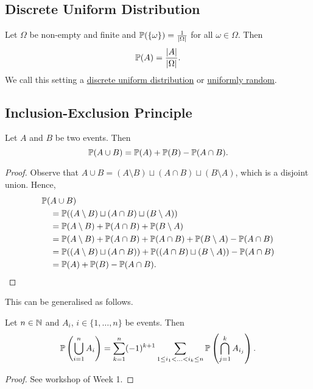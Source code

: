 \subsection{Discrete Uniform Distribution}
\begin{defn}
Let $\Omega$ be non-empty and finite and ${\mathbb P}(\{\omega\})= \frac{1}{\vert \Omega \vert }$ for all $\omega \in \Omega$.  Then
\[ {\mathbb P}(A) = \frac{ \vert A \vert }{ \vert \Omega \vert }. \]
We call this setting a \underline{discrete uniform distribution} or \underline{uniformly random}.
\end{defn}

\subsection{Inclusion-Exclusion Principle}

\begin{thm}
Let $A$ and $B$ be two events. Then
\[{\mathbb P}(A \cup B) = {\mathbb P}(A) + {\mathbb P}(B) - {\mathbb P}(A \cap B).\]
\end{thm}
\begin{proof}
Observe that $A \cup B = (A \setminus B) \sqcup (A \cap B) \sqcup (B \setminus A)$, which is a disjoint union. Hence,
\begin{align*}
{\mathbb P}(&A \cup B) 
\\ 
&= {\mathbb P}( (A \setminus B) \sqcup (A \cap B) \sqcup (B \setminus A) )
\\&
= {\mathbb P}(A \setminus B) + {\mathbb P}(A \cap B) + {\mathbb P}(B \setminus A)
\\&
= {\mathbb P}(A \setminus B) + {\mathbb P}(A \cap B) + {\mathbb P}(A \cap B) + {\mathbb P}(B \setminus A) - {\mathbb P}(A \cap B)
\\&
= {\mathbb P}((A \setminus B) \sqcup (A \cap B) ) + {\mathbb P}( (A \cap B) \sqcup (B \setminus A)) - {\mathbb P}( A \cap B)
\\&
= {\mathbb P}( A ) + {\mathbb P}(B) - {\mathbb P}( A \cap B).
\end{align*}
\end{proof}
\noindent This can be generalised as follows.
\begin{thm}
Let $n \in {\mathbb N}$ and $A_i$, $i\in \{ 1, \ldots, n \}$ be events. Then
\[{\mathbb P}\left(\bigcup_{i=1}^n A_i \right) = \sum_{k=1}^n (-1)^{k+1} \sum\limits_{1 \leq i_1 < \ldots < i_k \leq n} {\mathbb P}\left( \bigcap_{j=1}^k A_{i_j}\right).\]
\end{thm}
\begin{proof}
See workshop of Week 1.
\end{proof}